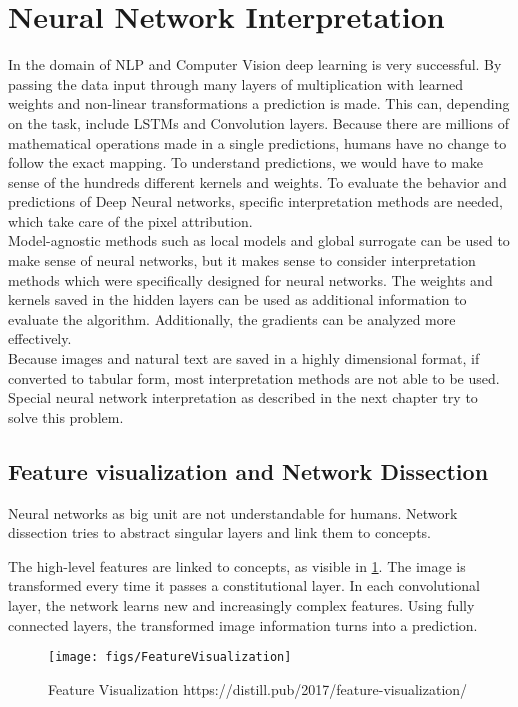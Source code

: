 \section{Neural Network Interpretation}
\label{sec:nni}
In the domain of NLP and Computer Vision deep learning is very successful. By passing the data input through many layers of multiplication with learned weights and non-linear transformations a prediction is made. This can, depending on the task, include LSTMs and Convolution layers. Because there are millions of mathematical operations made in a single predictions, humans have no change to follow the exact mapping. To understand predictions, we would have to make sense of the hundreds different kernels and weights. To evaluate the behavior and predictions of Deep Neural networks, specific interpretation methods are needed, which take care of the pixel attribution.
\\
Model-agnostic methods such as local models and global surrogate can be used to make sense of neural networks, but it makes sense to consider interpretation methods which were specifically designed for neural networks. The weights and kernels saved in the hidden layers can be used as additional information to evaluate the algorithm. Additionally, the gradients can be analyzed more effectively.
\\
Because images and natural text are saved in a highly dimensional format, if converted to tabular form, most interpretation methods are not able to be used. Special neural network interpretation as described in the next chapter try to solve this problem.

\subsection{Feature visualization and Network Dissection}

Neural networks as big unit are not understandable for humans. Network dissection tries to abstract singular layers and link them to concepts.

The high-level features are linked to concepts, as visible in \ref{fig:feature-visualization}. The image is transformed every time it passes a constitutional layer. In each convolutional layer, the network learns new and increasingly complex features. Using fully connected layers, the transformed image information turns into a prediction.

\begin{figure}[h!]
	\centering
	\texttt{[image: figs/FeatureVisualization]}
	\caption{Feature Visualization https://distill.pub/2017/feature-visualization/}
	\label{fig:feature-visualization}
\end{figure}

